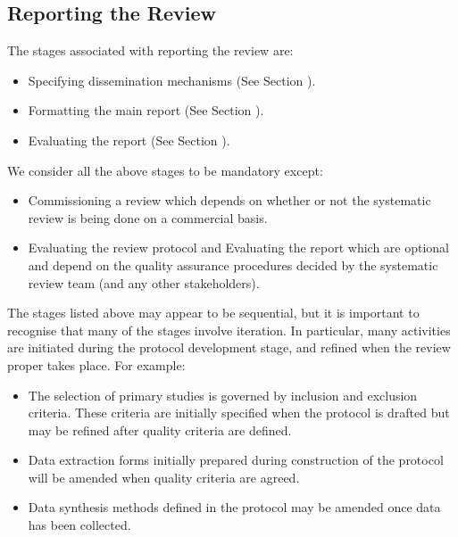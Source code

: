 \subsection{Reporting the Review}
The stages associated with reporting the review are:
\begin{itemize}
	\item Specifying dissemination mechanisms (See Section ).
	\item Formatting the main report (See Section ).
	\item Evaluating the report (See Section ).
\end{itemize}

We consider all the above stages to be mandatory except:
\begin{itemize}
	\item Commissioning a review which depends on whether or not the systematic review is being done on a
	      commercial basis.
	\item Evaluating the review protocol and Evaluating the report which are optional and depend on the
	      quality assurance procedures decided by the systematic review team (and any other stakeholders).
\end{itemize}

The stages listed above may appear to be sequential, but it is important to recognise that many of
the stages involve iteration. In particular, many activities are initiated during the protocol
development stage, and refined when the review proper takes place. For example:
\begin{itemize}
	\item The selection of primary studies is governed by inclusion and exclusion criteria. These criteria
	      are initially specified when the protocol is drafted but may be refined after quality criteria are
	      defined.
	\item Data extraction forms initially prepared during construction of the protocol will be amended when
	      quality criteria are agreed.
	\item Data synthesis methods defined in the protocol may be amended once data has been collected.
\end{itemize}

